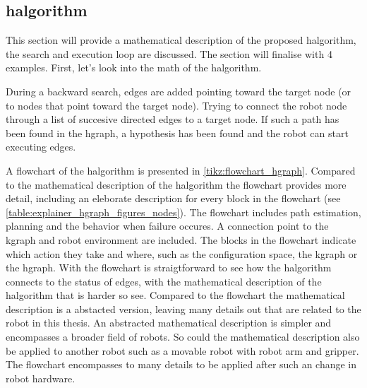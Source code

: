 \subsection{\acl{halgorithm}}%
\label{subsec:halgorithm}
This section will provide a mathematical description of the proposed \ac{halgorithm}, the search and execution loop are discussed. The section will finalise with 4 examples. First, let's look into the math of the \ac{halgorithm}.\bs


During a backward search, edges are added pointing toward the target node (or to nodes that point toward the target node). Trying to connect the robot node through a list of succesive directed edges to a target node. If such a path has been found in the \ac{hgraph}, a hypothesis has been found and the robot can start executing edges.

A flowchart of the \ac{halgorithm} is presented in \cref{tikz:flowchart_hgraph}. Compared to the mathematical description of the \ac{halgorithm} the flowchart provides more detail, including an eleborate description for every block in the flowchart (see \cref{table:explainer_hgraph_figures_nodes}). The flowchart includes path estimation, planning and the behavior when failure occures. A connection point to the \ac{kgraph} and robot environment are included. The blocks in the flowchart indicate which action they take and where, such as the configuration space, the \ac{kgraph} or the \ac{hgraph}. With the flowchart is straigtforward to see how the \ac{halgorithm} connects to the status of edges, with the mathematical description of the \ac{halgorithm} that is harder so see. Compared to the flowchart the mathematical description is a abstacted version, leaving many details out that are related to the robot in this thesis. An abstracted mathematical description is simpler and encompasses a broader field of robots. So could the mathematical description also be applied to another robot such as a movable robot with robot arm and gripper. The flowchart encompasses to many details to be applied after such an change in robot hardware. 



